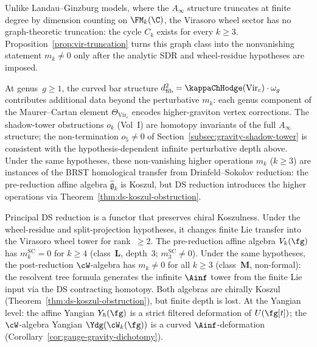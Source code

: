\begin{remark}
Unlike Landau--Ginzburg models, where the $A_\infty$ structure
truncates at finite degree by dimension counting on $\FM_k(\C)$,
the Virasoro wheel sector has no graph-theoretic truncation: the
cycle $C_k$ exists for every $k\ge3$. Proposition~\ref{prop:vir-truncation}
turns this graph class into the nonvanishing statement
$m_k\ne0$ only after the analytic SDR and wheel-residue hypotheses are
imposed.

At genus~$g \ge 1$, the curved bar structure
$d^2_{\mathrm{fib}} = \kappaChHodge(\mathrm{Vir}_c) \cdot \omega_g$
contributes additional data beyond the perturbative $m_k$: each
genus component of the Maurer--Cartan element $\Theta_{\mathrm{Vir}_c}$
encodes higher-graviton vertex corrections. The shadow-tower
obstructions $o_k$ (Vol~I) are homotopy invariants of the full
$A_\infty$ structure; the non-termination $o_5 \ne 0$ of
Section~\ref{subsec:gravity-shadow-tower} is consistent with the
hypothesis-dependent infinite perturbative depth above.
Under the same hypotheses, these non-vanishing higher operations
$m_k$ ($k \ge 3$) are instances of the BRST homological transfer from
Drinfeld--Sokolov reduction: the pre-reduction affine algebra
$\hat{\mathfrak{g}}_k$ is Koszul, but DS reduction introduces the
higher operations via Theorem~\ref{thm:ds-koszul-obstruction}.
\end{remark}

\begin{remark}%
\label{rem:ds-koszul-formality-scissors}%
%
Principal DS reduction is a functor that preserves chiral
Koszulness. Under the wheel-residue and split-projection hypotheses,
it changes finite Lie transfer into the Virasoro wheel tower for
rank~$\ge 2$.
The pre-reduction affine algebra $V_k(\fg)$ has
$m_k^{\mathrm{SC}} = 0$ for $k \ge 4$ (class~$\mathbf{L}$, depth~$3$; $m_3^{\mathrm{SC}} \neq 0$).
Under the same hypotheses, the post-reduction $\cW$-algebra has
$m_k \neq 0$ for all $k \ge 3$ (class~$\mathbf{M}$, non-formal): the
resolvent tree formula generates the infinite $\Ainf$ tower from the
finite Lie input via the DS contracting homotopy. Both algebras
are chirally Koszul (Theorem~\ref{thm:ds-koszul-obstruction}),
but finite depth is lost. At the Yangian level: the affine
Yangian $Y_\hbar(\fg)$ is a strict filtered deformation of
$U(\fg[t])$; the $\cW$-algebra Yangian $\Ydg(\cW_k(\fg))$ is
a curved $\Ainf$-deformation
(Corollary~\ref{cor:gauge-gravity-dichotomy}).
\end{remark}

